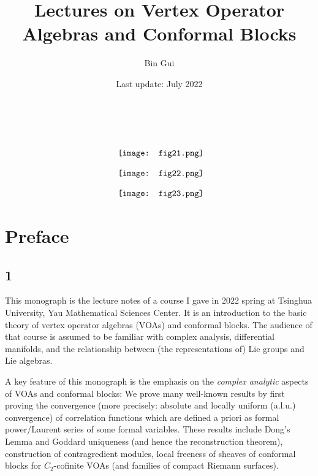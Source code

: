 \documentclass[11pt,b5paper,notitlepage]{article}
\title{Lectures on Vertex Operator Algebras and Conformal Blocks}
\author{{\sc Bin Gui}
}
\date{Last update: July 2022}
\theoremstyle{definition}
\theoremstyle{plain}
\numberwithin{equation}{section}
\begin{document}
\sloppy %
	\setcounter{page}{0}
	\setcounter{section}{-1}
	






	
	\maketitle
\thispagestyle{empty}	
\begin{gather*}
{~}\\[3ex]
	\vcenter{\hbox{{
				\texttt{[image: fig21.png]}}}}\\[2ex]
	\vcenter{\hbox{{
				\texttt{[image: fig22.png]}}}}\\[2ex]
	\vcenter{\hbox{{
				\texttt{[image: fig23.png]}}}}
\end{gather*}




	
	\newpage
\tableofcontents
	


\newpage

\section*{Preface}


\subsection*{1}


This monograph is the lecture notes of a course I gave in 2022 spring at Tsinghua University, Yau Mathematical Sciences Center. It is an introduction to the basic theory of vertex operator algebras (VOAs) and conformal blocks. The audience of that course is assumed to be familiar with complex analysis, differential manifolds, and the relationship between (the representations of) Lie groups and Lie algebras. 

A key feature of this monograph is the emphasis on the \emph{complex analytic} aspects of VOAs and conformal blocks: We prove many well-known results by first proving the convergence (more precisely: absolute and locally uniform (a.l.u.) convergence) of  correlation functions which are defined a priori as formal power/Laurent series of some formal variables. These results include Dong's Lemma and Goddard uniqueness (and hence the reconstruction theorem), construction of contragredient modules, local freeness of sheaves of conformal blocks for $C_2$-cofinite VOAs (and families of compact Riemann surfaces). 
\end{document}
